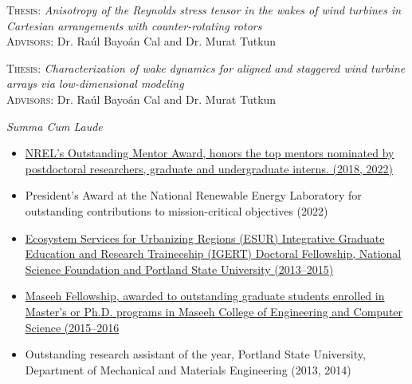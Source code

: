 \documentclass[10pt,ragged2e,a4paper,academicons]{altacv}
\begin{document}
\divider

\textsc{Thesis:} \emph{Anisotropy of the Reynolds stress tensor in the wakes of wind turbines in Cartesian arrangements with counter-rotating rotors}\\
\textsc{Advisors:} Dr. Ra\'ul Bayo\'an Cal and Dr. Murat Tutkun

\divider

\textsc{Thesis:} \emph{Characterization of wake dynamics for aligned and staggered wind turbine arrays via low-dimensional modeling}\\
\textsc{Advisors:} Dr. Ra\'ul Bayo\'an Cal and Dr. Murat Tutkun

\divider

\textit{Summa Cum Laude}


\begin{itemize}
    \item \href{https://thesource.nrel.gov/headlines/posts/2018-09/nrel-honors-outstanding-mentors-2018.html}{NREL's Outstanding Mentor Award, honors the top mentors nominated by postdoctoral researchers, graduate and undergraduate interns. (2018, 2022)}
    \item President's Award at the National Renewable Energy Laboratory for outstanding contributions to mission-critical objectives (2022) 
    \item \href{http://www.pdx.edu/esur-igert/}{Ecosystem Services for Urbanizing Regions (ESUR) Integrative Graduate Education and Research Traineeship (IGERT) Doctoral Fellowship, National Science Foundation and Portland State University (2013--2015)}
    \item \href{https://www.pdx.edu/cecs/scholarships-fellowships}{Maseeh Fellowship, awarded to outstanding graduate students enrolled in Master's or Ph.D. programs in Maseeh College of Engineering and Computer Science (2015--2016}
    \item Outstanding research assistant of the year, Portland State University, Department of Mechanical and Materials Engineering (2013, 2014)
\end{itemize}
\end{document}
